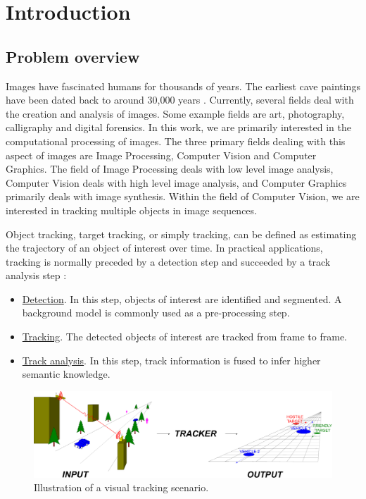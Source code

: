 \chapter{Introduction}
\label{chap_Introduction}	

\section{Problem overview}
Images have fascinated humans for thousands of years.  The earliest cave paintings have been dated back to around 30,000 years \cite{2009_WEB_EarliestHumanPaintings_Gray}.  Currently, several fields deal with the creation and analysis of images.  Some example fields are art, photography, calligraphy and digital forensics.  In this work, we are primarily interested in the computational processing of images.  The three primary fields dealing with this aspect of images are Image Processing, Computer Vision and Computer Graphics.  The field of Image Processing deals with low level image analysis, Computer Vision deals with high level image analysis, and Computer Graphics primarily deals with image synthesis.  Within the field of Computer Vision, we are interested in tracking multiple objects in image sequences.

Object tracking, target tracking, or simply tracking, can be defined as estimating the trajectory of an object of interest over time.  In practical applications, tracking is normally preceded by a detection step and succeeded by a track analysis step \cite{2006_JNL_SURVEYtrk_Yilmaz}:

\begin{itemize}
\item \underline{Detection}.  In this step, objects of interest are identified and segmented.  A background model is commonly used as a pre-processing step.
\item  \underline{Tracking}.  The detected objects of interest are tracked from frame to frame.  
\item  \underline{Track analysis}.  In this step, track information is fused to infer higher semantic knowledge.
\end{itemize}

\begin{figure}[t]
	\center
	\includegraphics[width=1.1\textwidth]{thesis/TRK_overviewDiagram.pdf}
	\caption{Illustration of a visual tracking scenario.}
	\label{fig:TRK_illustration}
\end{figure}

